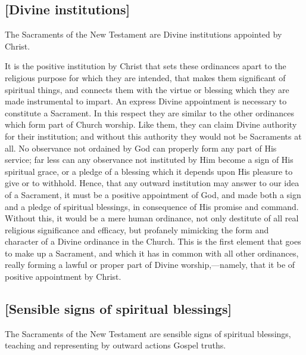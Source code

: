 \documentclass[
]{book}
\begin{document}

\hypertarget{divine-institutions}{%
\subsection{{[}Divine institutions{]}}\label{divine-institutions}}

The Sacraments of the New Testament are Divine institutions appointed by Christ.

It is the positive institution by Christ that sets these ordinances apart to the religious purpose for which they are intended, that makes them significant of spiritual things, and connects them with the virtue or blessing which they are made instrumental to impart. An express Divine appointment is necessary to constitute a Sacrament. In this respect they are similar to the other ordinances which form part of Church worship. Like them, they can claim Divine authority for their institution; and without this authority they would not be Sacraments at all. No observance not ordained by God can properly form any part of His service; far less can any observance not instituted by Him become a sign of His spiritual grace, or a pledge of a blessing which it depends upon His pleasure to give or to withhold. Hence, that any outward institution may answer to our idea of a Sacrament, it must be a positive appointment of God, and made both a sign and a pledge of spiritual blessings, in consequence of His promise and command. Without this, it would be a mere human ordinance, not only destitute of all real religious significance and efficacy, but profanely mimicking the form and character of a Divine ordinance in the Church. This is the first element that goes to make up a Sacrament, and which it has in common with all other ordinances, really forming a lawful or proper part of Divine worship,---namely, that it be of positive appointment by Christ.

\hypertarget{sensible-signs-of-spiritual-blessings}{%
\subsection{{[}Sensible signs of spiritual blessings{]}}\label{sensible-signs-of-spiritual-blessings}}

The Sacraments of the New Testament are sensible signs of spiritual blessings, teaching and representing by outward actions Gospel truths.
\end{document}
